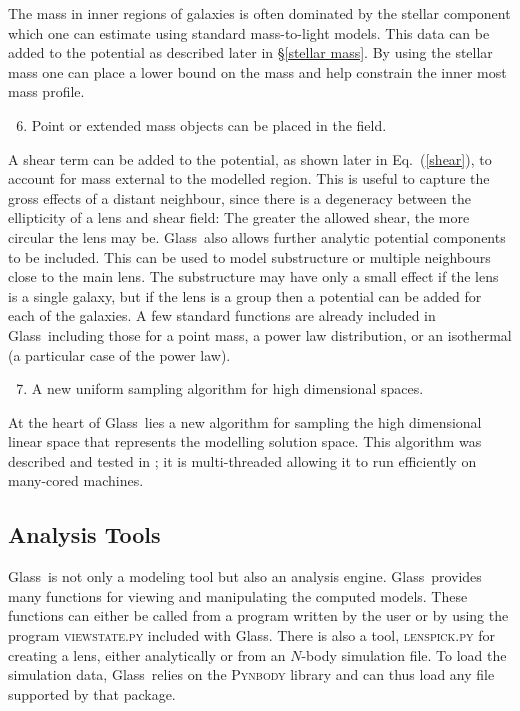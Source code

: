 \documentclass[galley,usenatbib]{mn2e}
\newcommand{\Glass}{{\sc Glass}}
\newcommand{\eqnref}[1] {Eq.~(\ref{#1})}
\newcommand{\secref}[1] {\S\ref{#1}}
\begin{document}
%
The mass in inner regions of galaxies is often dominated by the stellar component
which one can estimate using standard mass-to-light models. This data can be added
to the potential as described later in \secref{stellar mass}. By using the stellar
mass one can place a lower bound on the mass and help constrain the inner most
mass profile.
%
\begin{enumerate}
  \setcounter{enumi}{5}
  \item Point or extended mass objects can be placed in the field.
\end{enumerate}
%
A shear term can be added to the potential, as shown later in \eqnref{shear},
to account for mass external to the modelled region. This is useful to capture
the gross effects of a distant neighbour, since there is a degeneracy between
the ellipticity of a lens and shear field: The greater the allowed shear, the
more circular the lens may be.  \Glass\ also allows further analytic potential
components to be included. This can be used to model substructure or multiple
neighbours close to the main lens. The substructure may have only a small
effect if the lens is a single galaxy, but if the lens is a group then a
potential can be added for each of the galaxies. A few standard functions are
already included in \Glass\ including those for a point mass, a power law
distribution, or an isothermal (a particular case of the power law).
%
\begin{enumerate}
  \setcounter{enumi}{6}
  \item A new uniform sampling algorithm for high dimensional spaces.
\end{enumerate}
%
At the heart of \Glass\ lies a new algorithm for sampling the high dimensional
linear space that represents the modelling solution space. This algorithm was
described and tested in \cite{2012MNRAS.425.3077L}; it is multi-threaded
allowing it to run efficiently on many-cored machines.  

\subsection{Analysis Tools}\label{sec:tools}
\Glass\ is not only a modeling tool but also an analysis engine. \Glass\
provides many functions for viewing and manipulating the computed models.
These functions can either be called from a program written by the user or by
using the program \textsc{viewstate.py} included with \Glass. There is also a
tool, \textsc{lenspick.py} for creating a lens, either analytically or from an
$N$-body simulation file. To load the simulation data, \Glass\ relies on the
\textsc{Pynbody} library \citep{pynbody} and can thus load any file supported
by that package.
\end{document}
